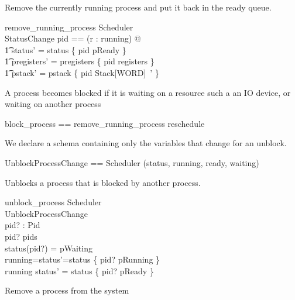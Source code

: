 \documentclass{article}
\begin{document}
Remove the currently running process and put it back in the ready queue.

\begin{schema}{remove\_running\_process}
  \Delta Scheduler\\
  \Xi StatusChange
\where
  \exists pid == (\mu r : running) @\\
    \t1 status' = status \oplus \{ pid \mapsto pReady \} \land\\
    \t1 pregisters' = pregisters \oplus \{ pid \mapsto registers \} \land\\
    \t1 pstack' = pstack \oplus \{ pid \mapsto \theta Stack[WORD]~' \}
\end{schema}

A process becomes blocked if it is waiting on a resource such a an IO
device, or waiting on another process 

\begin{zed}
  block\_process == remove\_running\_process \semi reschedule
\end{zed}

We declare a schema containing only the variables that change for an
unblock.

\begin{zed}
  UnblockProcessChange == Scheduler \hide (status, running, ready, waiting)
\end{zed}

Unblocks a process that is blocked by another process.

\begin{schema}{unblock\_process}
  \Delta Scheduler\\
  \Xi UnblockProcessChange\\
  pid? : Pid\\
\where
  pid? \in pids\\
  status(pid?) = pWaiting\\
  running=\emptyset \iff status'=status \oplus \{ pid? \mapsto pRunning \}\\
  running \neq \emptyset \iff status' = status \oplus \{ pid? \mapsto pReady \}
\end{schema}

Remove a process from the system
\end{document}
